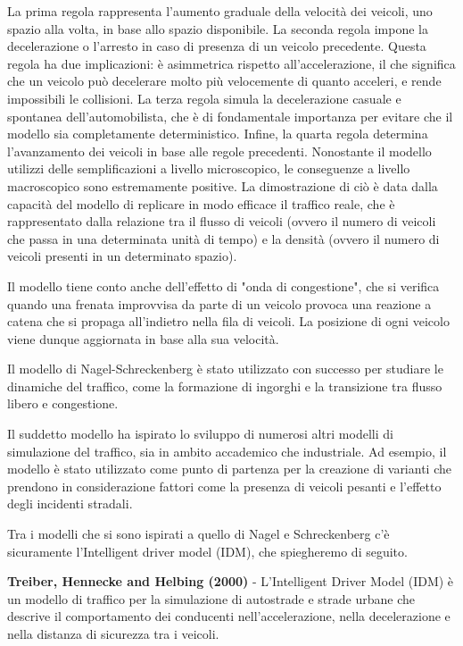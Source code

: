 \documentclass[11pt]{article}
\begin{document}
La prima regola rappresenta l'aumento graduale della velocità dei veicoli, uno spazio alla volta, in base allo spazio disponibile. La seconda regola impone la decelerazione o l'arresto in caso di presenza di un veicolo precedente. Questa regola ha due implicazioni: è asimmetrica rispetto all'accelerazione, il che significa che un veicolo può decelerare molto più velocemente di quanto acceleri, e rende impossibili le collisioni. La terza regola simula la decelerazione casuale e spontanea dell'automobilista, che è di fondamentale importanza per evitare che il modello sia completamente deterministico. Infine, la quarta regola determina l'avanzamento dei veicoli in base alle regole precedenti. Nonostante il modello utilizzi delle semplificazioni a livello microscopico, le conseguenze a livello macroscopico sono estremamente positive. La dimostrazione di ciò è data dalla capacità del modello di replicare in modo efficace il traffico reale, che è rappresentato dalla relazione tra il flusso di veicoli (ovvero il numero di veicoli che passa in una determinata unità di tempo) e la densità (ovvero il numero di veicoli presenti in un determinato spazio).

Il modello tiene conto anche dell'effetto di "onda di congestione", che si verifica quando una frenata improvvisa da parte di un veicolo provoca una reazione a catena che si propaga all'indietro nella fila di veicoli. La posizione di ogni veicolo viene dunque aggiornata in base alla sua velocità.

Il modello di Nagel-Schreckenberg è stato utilizzato con successo per studiare le dinamiche del traffico, come la formazione di ingorghi e la transizione tra flusso libero e congestione.

Il suddetto modello ha ispirato lo sviluppo di numerosi altri modelli di simulazione del traffico, sia in ambito accademico che industriale. Ad esempio, il modello è stato utilizzato come punto di partenza per la creazione di varianti che prendono in considerazione fattori come la presenza di veicoli pesanti e l'effetto degli incidenti stradali.

Tra i modelli che si sono ispirati a quello di Nagel e Schreckenberg c'è sicuramente l'Intelligent driver model (IDM), che spiegheremo di seguito.

\textbf{Treiber, Hennecke and Helbing (2000)} - L'Intelligent Driver Model (IDM) è un modello di traffico per la simulazione di autostrade e strade urbane che descrive il comportamento dei conducenti nell'accelerazione, nella decelerazione e nella distanza di sicurezza tra i veicoli.
\end{document}
